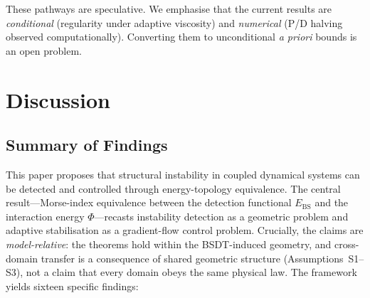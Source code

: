 \documentclass[final]{siamltex}
\newcommand{\Ebs}{E_{\mathrm{BS}}}
\begin{document}
These pathways are speculative. We emphasise that the current
results are \emph{conditional} (regularity under adaptive viscosity)
and \emph{numerical} (P/D halving observed computationally).
Converting them to unconditional \emph{a priori} bounds is an
open problem.


\section{Discussion}\label{sec:discussion}

\subsection{Summary of Findings}

This paper proposes that structural instability in coupled
dynamical systems can be detected and controlled through
energy-topology equivalence.  The central result---Morse-index
equivalence between the detection functional $\Ebs$ and the
interaction energy $\Phi$---recasts instability detection as a
geometric problem and adaptive stabilisation as a gradient-flow
control problem.  Crucially, the claims are \emph{model-relative}:
the theorems hold within the BSDT-induced geometry, and
cross-domain transfer is a consequence of shared geometric
structure (Assumptions~S1--S3), not a claim that every domain
obeys the same physical law.  The framework yields sixteen specific findings:
\end{document}
